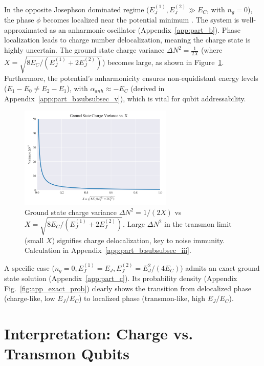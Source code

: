 \documentclass[12pt]{article}
\begin{document}
In the opposite Josephson dominated regime ($E_J^{(1)}, E_J^{(2)} \gg E_C$, with $n_g=0$), the phase $\phi$ becomes localized near the potential minimum \cite{Koch2007}. The system is well-approximated as an anharmonic oscillator (Appendix~\ref{app:part_b}). Phase localization leads to charge number delocalization, meaning the charge state is highly uncertain. The ground state charge variance $\Delta N^2 = \frac{1}{2X}$ (where $X = \sqrt{8 E_C / (E_J^{(1)} + 2 E_J^{(2)})}$) becomes large, as shown in Figure~\ref{fig:delta_n_variance}. Furthermore, the potential's anharmonicity ensures non-equidistant energy levels ($E_1-E_0 \neq E_2-E_1$), with $\alpha_{anh} \approx -E_C$ (derived in Appendix~\ref{app:part_b:subsubsec_v}), which is vital for qubit addressability.

\begin{figure}[htbp]
    \centering
    \includegraphics[width=0.65\textwidth]{fig_delta_n_variance.png}
    \caption{Ground state charge variance $\Delta N^2 = 1/(2X)$ vs $X = \sqrt{8 E_C / (E_J^{(1)} + 2 E_J^{(2)})}$. Large $\Delta N^2$ in the transmon limit (small $X$) signifies charge delocalization, key to noise immunity. Calculation in Appendix~\ref{app:part_b:subsubsec_iii}.}
    \label{fig:delta_n_variance} 
\end{figure}

A specific case ($n_g=0, E_J^{(1)}=E_J, E_J^{(2)}=E_J^2/(4E_C)$) admits an exact ground state solution (Appendix~\ref{app:part_c}). Its probability density (Appendix Fig.~\ref{fig:app_exact_prob}) clearly shows the transition from delocalized phase (charge-like, low $E_J/E_C$) to localized phase (transmon-like, high $E_J/E_C$).

\section*{Interpretation: Charge vs. Transmon Qubits}
\end{document}
